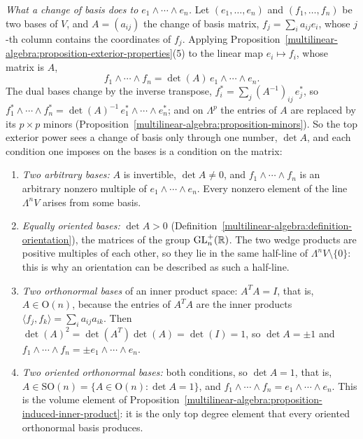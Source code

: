 \begin{remark}\label{multilinear-algebra:remark-change-of-basis-top}
\emph{What a change of basis does to $e_1 \wedge \cdots \wedge e_n$.} Let $(e_1, \ldots, e_n)$ and $(f_1, \ldots, f_n)$ be two bases of $V$, and $A = (a_{ij})$ the change of basis matrix, $f_j = \sum_ia_{ij}e_i$, whose $j$-th
column contains the coordinates of $f_j$. Applying Proposition~\ref{multilinear-algebra:proposition-exterior-properties}(5) to the linear map $e_i \mapsto f_i$, whose matrix is $A$,
\[
f_1 \wedge \cdots \wedge f_n = \det(A)\,e_1 \wedge \cdots \wedge e_n .
\]
The dual bases change by the inverse transpose, $f^{*}_i = \sum_j(A^{-1})_{ij}\,e^{*}_j$, so $f^{*}_1 \wedge \cdots \wedge f^{*}_n = \det(A)^{-1}\,e^{*}_1 \wedge \cdots \wedge e^{*}_n$; and on $\Lambda^p$ the entries of $A$ are replaced by its
$p \times p$ minors (Proposition~\ref{multilinear-algebra:proposition-minors}). So the top exterior power sees a change of basis only through one number, $\det A$, and each condition one imposes on the bases is a
condition on the matrix:
\begin{enumerate}
\item \emph{Two arbitrary bases:} $A$ is invertible, $\det A \neq 0$, and $f_1 \wedge \cdots \wedge f_n$ is an arbitrary nonzero multiple of $e_1 \wedge \cdots \wedge e_n$. Every nonzero element of the line $\Lambda^nV$ arises from some basis.
\item \emph{Equally oriented bases:} $\det A > 0$ (Definition~\ref{multilinear-algebra:definition-orientation}), the matrices of the group $\mathrm{GL}_n^+(\mathbb{R})$. The two wedge products are positive multiples of each other, so they lie in the same
half-line of $\Lambda^nV \setminus \{0\}$: this is why an orientation can be described as such a half-line.
\item \emph{Two orthonormal bases} of an inner product space: $A^TA = I$, that is, $A \in \mathrm{O}(n)$, because the entries of $A^TA$ are the inner products $\langle f_j, f_k\rangle = \sum_ia_{ij}a_{ik}$. Then
$\det(A)^2 = \det(A^T)\det(A) = \det(I) = 1$, so $\det A = \pm1$ and $f_1 \wedge \cdots \wedge f_n = \pm e_1 \wedge \cdots \wedge e_n$.
\item \emph{Two oriented orthonormal bases:} both conditions, so $\det A = 1$, that is, $A \in \mathrm{SO}(n) = \{A \in \mathrm{O}(n) : \det A = 1\}$, and $f_1 \wedge \cdots \wedge f_n = e_1 \wedge \cdots \wedge e_n$. This is the
volume element of Proposition~\ref{multilinear-algebra:proposition-induced-inner-product}: it is the only top degree element that every oriented orthonormal basis produces.

\end{enumerate}
\end{remark}
